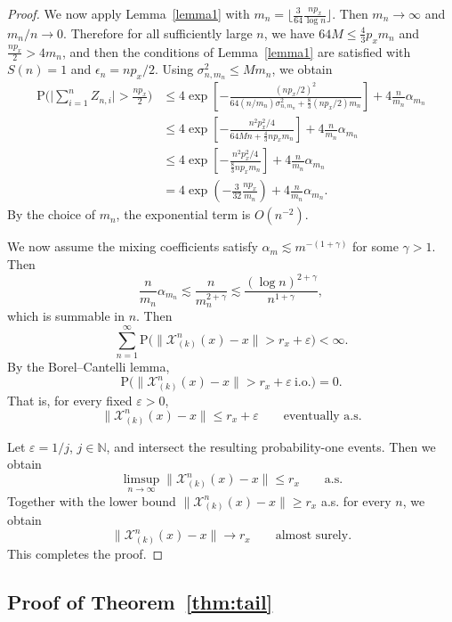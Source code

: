 \documentclass[12pt]{article}
\def\P{{\mathrm P}}
\theoremstyle{definition}
\begin{document}
\begin{proof}
We now apply Lemma~\ref{lemma1} with $m_n = \lfloor \frac{3}{64}\frac{np_x}{\log n}\rfloor$. Then \(m_n\to\infty\) and \(m_n/n \to 0\). Therefore for all sufficiently large $n$, we have $64M \le \frac{4}{3}p_x m_n$ and $
\frac{np_x}{2}>4m_n$, and then the conditions of Lemma~\ref{lemma1} are satisfied with \(S(n)=1\) and \(\epsilon_n=np_x/2\). Using \(\sigma_{n,m_n}^2\le M m_n\), we obtain
\begin{align*}
\P\Big(\Big|\sum_{i=1}^n Z_{n,i}\Big|>\frac{np_x}{2}\Big)
&\le
4\exp \left[
-\frac{(np_x/2)^2}{64(n/m_n)\sigma_{n,m_n}^2 + \frac83 (np_x/2)m_n}
\right]
+4\frac{n}{m_n}\alpha_{m_n} \\
&\le
4\exp \left[
-\frac{n^2p_x^2/4}{64Mn + \frac43 np_x m_n}
\right]
+4\frac{n}{m_n}\alpha_{m_n} \\
&\le
4\exp \left[
-\frac{n^2p_x^2/4}{\frac83 np_x m_n}
\right]
+4\frac{n}{m_n}\alpha_{m_n} \\
&=
4\exp \left(-\frac{3}{32}\frac{np_x}{m_n}\right)
+4\frac{n}{m_n}\alpha_{m_n}.
\end{align*}
By the choice of \(m_n\), the exponential term is \(O(n^{-2})\).

We now assume the mixing coefficients satisfy $\alpha_m \lesssim m^{-(1+\gamma)}$ for some $\gamma>1$. Then
\[
\frac{n}{m_n}\alpha_{m_n} \lesssim \frac{n}{m_n^{2+\gamma}} \lesssim \frac{(\log n)^{2+\gamma}}{n^{1+\gamma}},
\]
which is summable in $n$. Then
\[
\sum_{n=1}^\infty
\P\big(\|\mathcal X_{(k)}^n(x)-x\|>r_x+\varepsilon\big)
<\infty.
\]
By the Borel--Cantelli lemma,
\[
\P\big(\|\mathcal X_{(k)}^n(x)-x\|>r_x+\varepsilon\ \text{i.o.}\big)=0.
\]
That is, for every fixed \(\varepsilon>0\),
\[
\|\mathcal X_{(k)}^n(x)-x\|\le r_x+\varepsilon
\qquad\text{eventually a.s.}
\]

Let \(\varepsilon=1/j\), \(j\in\mathbb N\), and intersect the resulting probability-one events. Then we obtain
\[
\limsup_{n\to\infty}\|\mathcal X_{(k)}^n(x)-x\|\le r_x
\qquad\text{a.s.}
\]
Together with the lower bound \(\|\mathcal X_{(k)}^n(x)-x\|\ge r_x\) a.s. for every $n$, we obtain
\[
\|\mathcal X_{(k)}^n(x)-x\| \to r_x
\qquad\text{almost surely}.
\]
This completes the proof.

\end{proof}

\subsection{Proof of Theorem~\ref{thm:tail}}
\end{document}
